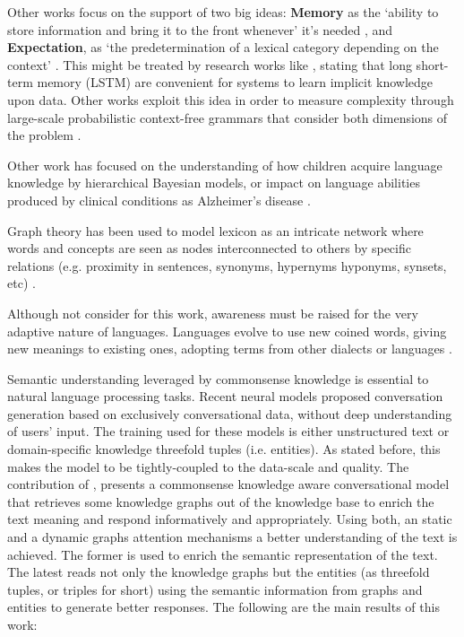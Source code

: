 \documentclass[runningheads]{llncs}
\begin{document}
Other works focus on the support of two big ideas: \textbf{Memory} as the `ability to store information and bring it to the front whenever' it's needed \cite{Poibeau2016}, and \textbf{Expectation}, as `the predetermination of a lexical category depending on the context' \cite{Poibeau2016}. This might be treated by research works like \cite{Ma2018}, stating that long short-term memory (LSTM) are convenient for systems to learn implicit knowledge upon data. Other works exploit this idea in order to measure complexity through large-scale probabilistic context-free grammars that consider both dimensions of the problem \cite{Hale2007}.

Other work has focused on the understanding of how children acquire language knowledge by hierarchical Bayesian models, or impact on language abilities produced by clinical conditions as Alzheimer's disease \cite{Poibeau2016}.

Graph theory has been used to model lexicon as an intricate network where words and concepts are seen as nodes interconnected to others by specific relations (e.g. proximity in sentences, synonyms, hypernyms hyponyms, synsets, etc) \cite{Poibeau2016}.

Although not consider for this work, awareness must be raised for the very adaptive nature of languages. Languages evolve to use new coined words, giving new meanings to existing ones, adopting terms from other dialects or languages \cite{Poibeau2016}.

Semantic understanding leveraged by commonsense knowledge is essential to natural language processing tasks. Recent neural models proposed conversation generation based on exclusively conversational data, without deep understanding of users' input. The training used for these models is either unstructured text or domain-specific knowledge threefold tuples (i.e. entities). As stated before, this makes the model to be tightly-coupled to the data-scale and quality. The contribution of \cite{Zhou2018}, presents a commonsense knowledge aware conversational model that retrieves some knowledge graphs out of the knowledge base to enrich the text meaning and respond informatively and appropriately. Using both, an static and a dynamic graphs attention mechanisms a better understanding of the text is achieved. The former is used to enrich the semantic representation of the text. The latest reads not only the knowledge graphs but the entities (as threefold tuples, or triples for short) using the semantic information from graphs and entities to generate better responses. The following are the main results of this work:
\end{document}
